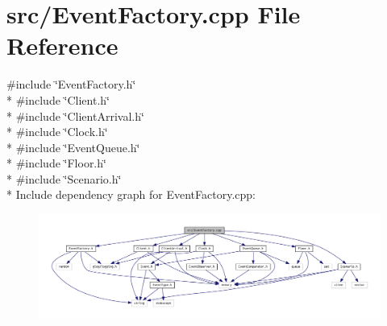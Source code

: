 \section{src/\+Event\+Factory.cpp File Reference}
\label{_event_factory_8cpp}
{\ttfamily \#include \char`\"{}Event\+Factory.\+h\char`\"{}}\\*
{\ttfamily \#include \char`\"{}Client.\+h\char`\"{}}\\*
{\ttfamily \#include \char`\"{}Client\+Arrival.\+h\char`\"{}}\\*
{\ttfamily \#include \char`\"{}Clock.\+h\char`\"{}}\\*
{\ttfamily \#include \char`\"{}Event\+Queue.\+h\char`\"{}}\\*
{\ttfamily \#include \char`\"{}Floor.\+h\char`\"{}}\\*
{\ttfamily \#include \char`\"{}Scenario.\+h\char`\"{}}\\*
Include dependency graph for Event\+Factory.\+cpp\+:
\nopagebreak
\begin{figure}[H]
\begin{center}
\leavevmode
\includegraphics[width=350pt]{_event_factory_8cpp__incl}
\end{center}
\end{figure}
